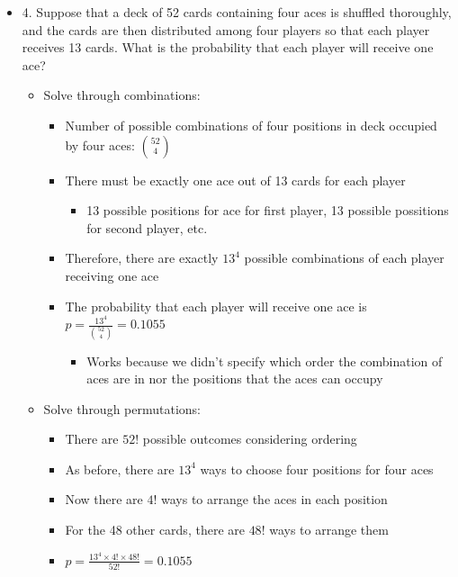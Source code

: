 \documentclass{article}
\begin{document}
\begin{itemize}
\begin{itemize}
\begin{itemize}
            \[
            P(C_2 \mid M_3) = \frac{1}{1+(1-p)} = \frac{1}{2-p}
            \]
        \end{itemize}
    \end{itemize}
    \item 4. Suppose that a deck of 52 cards containing four aces is shuffled thoroughly, and the cards are then distributed among four players so that each player receives 13 cards. What is the probability that each player will receive one ace?
    \begin{itemize}
        \item Solve through combinations:
        \begin{itemize}
            \item Number of possible combinations of four positions in deck occupied by four aces: $\binom{52}{4}$
            \item There must be exactly one ace out of 13 cards for each player
            \begin{itemize}
                \item 13 possible positions for ace for first player, 13 possible possitions for second player, etc.
            \end{itemize}
            \item Therefore, there are exactly $13^4$ possible combinations of each player receiving one ace
            \item The probability that each player will receive one ace is $p=\frac{13^4}{\binom{52}{4}}=0.1055$
            \begin{itemize}
                \item Works because we didn't specify which order the combination of aces are in nor the positions that the aces can occupy
            \end{itemize}
        \end{itemize}
        \item Solve through permutations:
        \begin{itemize}
            \item There are $52!$ possible outcomes considering ordering
            \item As before, there are $13^4$ ways to choose four positions for four aces
            \item Now there are $4!$ ways to arrange the aces in each position
            \item For the 48 other cards, there are $48!$ ways to arrange them
            \item $p=\frac{13^4 \times 4! \times 48!}{52!}=0.1055$

\end{itemize}
\end{itemize}
\end{itemize}
\end{document}

